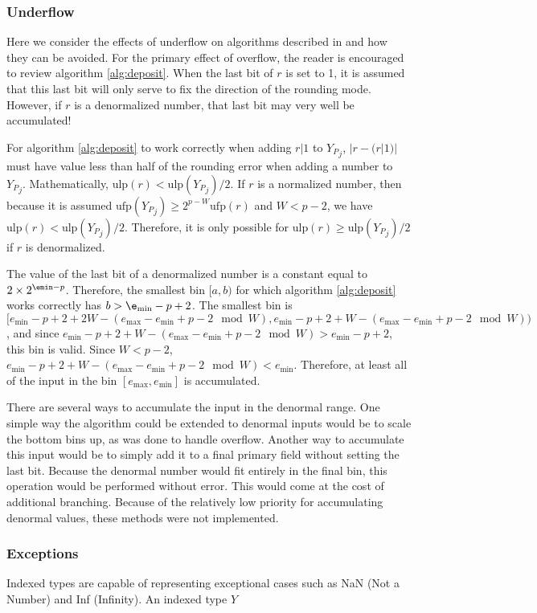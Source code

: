 \documentclass[12pt]{article}
\providecommand{\min}{\ensuremath{\text{min}}}
\providecommand{\max}{\ensuremath{\text{max}}}
\providecommand{\ulp}{\ensuremath{\text{ulp}}}
\providecommand{\ufp}{\ensuremath{\text{ufp}}}
\theoremstyle{plain}
\begin{document}
    \subsubsection{Underflow}
      Here we consider the effects of underflow on algorithms described in \cite{repsum} and how they can be avoided. For the primary effect of overflow, the reader is encouraged to review algorithm \ref{alg:deposit}. When the last bit of $r$ is set to 1, it is assumed that this last bit will only serve to fix the direction of the rounding mode. However, if $r$ is a denormalized number, that last bit may very well be accumulated!

      For algorithm \ref{alg:deposit} to work correctly when adding $r | 1$ to ${Y_P}_j$, $|r - (r | 1)|$ must have value less than half of the rounding error when adding a number to ${Y_P}_j$. Mathematically, $\ulp(r) < \ulp({Y_P}_j)/2$.
      If $r$ is a normalized number, then because it is assumed $\ufp({Y_P}_j) \geq 2^{p - W}\ufp(r)$ and $W < p - 2$, we have $\ulp(r) < \ulp({Y_P}_j)/2$. Therefore, it is only possible for $\ulp(r) \geq \ulp({Y_P}_j)/2$ if $r$ is denormalized.

      The value of the last bit of a denormalized number is a constant equal to $2 \times 2^{\emin - p}$. Therefore, the smallest bin $[a, b)$ for which algorithm \ref{alg:deposit} works correctly has $b > \e_{\min} - p + 2$. The smallest bin is $[e_{\min} - p + 2 + 2W - (e_{\max} - e_{\min} + p - 2 \mod W), e_{\min} - p + 2 + W - (e_{\max} - e_{\min} + p - 2 \mod W))$, and since $e_{\min} - p + 2 + W - (e_{\max} - e_{\min} + p - 2 \mod W) > e_{\min} - p + 2$, this bin is valid.
      Since $W < p - 2$, $e_{\min} - p + 2 + W - (e_{\max} - e_{\min} + p - 2 \mod W) < e_{\min}$. Therefore, at least all of the input in the bin $[e_{\max}, e_{\min}]$ is accumulated.

      There are several ways to accumulate the input in the denormal range. One simple way the algorithm could be extended to denormal inputs would be to scale the bottom bins up, as was done to handle overflow. Another way to accumulate this input would be to simply add it to a final primary field without setting the last bit. Because the denormal number would fit entirely in the final bin, this operation would be performed without error. This would come at the cost of additional branching. Because of the relatively low priority for accumulating denormal values, these methods were not implemented.
    \subsubsection{Exceptions}
      Indexed types are capable of representing exceptional cases such as NaN (Not a Number) and Inf (Infinity). An indexed type $Y$ 
\end{document}
